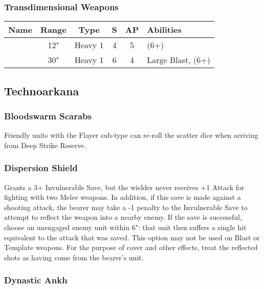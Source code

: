 \subsubsection{Transdimensional Weapons}
\label{Transdimensional Beamer}
\noindent
\begin{NiceTabular}{m{130 pt} *{4}{c} >{\raggedright\arraybackslash}p{240pt}}
	Name & Range & Type & S & AP & Abilities \\
	\hline
	 & 12" & Heavy 1 & 4 & 5 &  (6+) \\
	  & 30" & Heavy 1 & 6 & 4 & Large Blast,  (6+) \\
\end{NiceTabular}


\subsection{Technoarkana} \label{Technoarcana}


\subsubsection{Bloodswarm Scarabs} \label{Bloodswarm Scarabs}

Friendly units with the Flayer sub-type can re-roll the scatter dice when arriving from Deep Strike Reserve. 

\subsubsection{Dispersion Shield} \label{Dispersion Shield}

Grants a 3+ Invulnerable Save, but the wielder never receives +1 Attack for fighting with two Melee weapons. In addition, if this save is made against a shooting attack, the bearer may take a -1 penalty to the Invulnerable Save to attempt to reflect the weapon into a nearby enemy. If the save is successful, choose an unengaged enemy unit within 6": that unit then suffers a single hit equivalent to the attack that was saved. This option may not be used on Blast or Template weapons. For the purpose of cover and other effects, treat the reflected shots as having come from the bearer's unit.

\subsubsection{Dynastic Ankh} \label{Dynastic Ankh}

